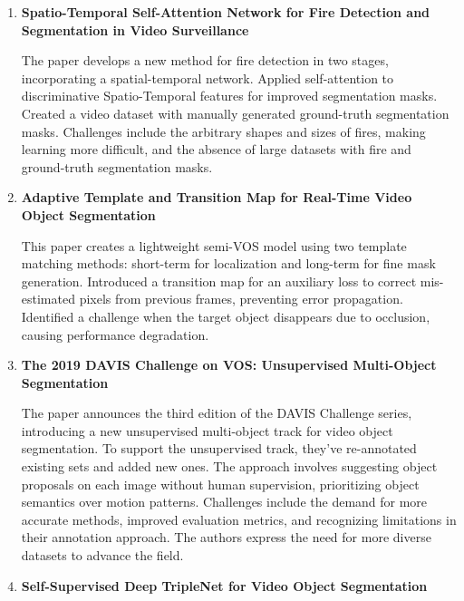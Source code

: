 \begin{enumerate}
 
 \item \textbf{Spatio-Temporal Self-Attention Network for Fire Detection and Segmentation in Video Surveillance}\cite{13}

The paper develops a new method for fire detection in two stages, incorporating a spatial-temporal network. Applied self-attention to discriminative Spatio-Temporal features for improved segmentation masks. Created a video dataset with manually generated ground-truth segmentation masks. Challenges include the arbitrary shapes and sizes of fires, making learning more difficult, and the absence of large datasets with fire and ground-truth segmentation masks.
\\


\item \textbf{Adaptive Template and Transition Map for Real-Time Video Object Segmentation}\cite{14} 

This paper creates a lightweight semi-VOS model using two template matching methods: short-term for localization and long-term for fine mask generation. Introduced a transition map for an auxiliary loss to correct mis-estimated pixels from previous frames, preventing error propagation. Identified a challenge when the target object disappears due to occlusion, causing performance degradation.


\item \textbf{The 2019 DAVIS Challenge on VOS: Unsupervised Multi-Object Segmentation}\cite{3}

The paper announces the third edition of the DAVIS Challenge series, introducing a new unsupervised multi-object track for video object segmentation. To support the unsupervised track, they've re-annotated existing sets and added new ones. The approach involves suggesting object proposals on each image without human supervision, prioritizing object semantics over motion patterns. Challenges include the demand for more accurate methods, improved evaluation metrics, and recognizing limitations in their annotation approach. The authors express the need for more diverse datasets to advance the field.

  
\item \textbf{Self-Supervised Deep TripleNet for Video Object Segmentation}\cite{6}


\end{enumerate}
